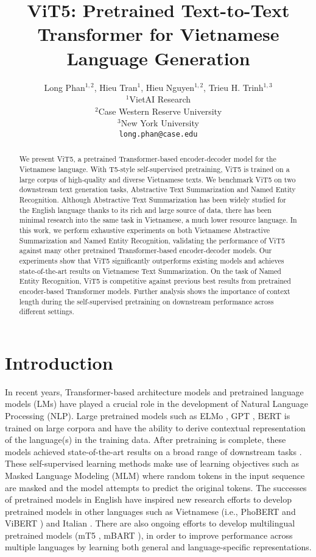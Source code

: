 \documentclass[11pt,a4paper]{article}
\title{ViT5: Pretrained Text-to-Text Transformer for Vietnamese Language Generation}
\author{Long Phan$^{1,2}$, Hieu Tran$^{1}$, Hieu Nguyen$^{1,2}$, Trieu H. Trinh$^{1,3}$ \\
        $^{1}$VietAI Research \\  $^{2}$Case Western Reserve University \\
        $^{3}$New York University \\
        \texttt{long.phan@case.edu}}
\date{}
\begin{document}
\maketitle
\begin{abstract}




We present ViT5, a pretrained Transformer-based encoder-decoder model for the Vietnamese language. 
With T5-style self-supervised pretraining, ViT5 is trained on a large corpus of high-quality and diverse Vietnamese texts. We benchmark ViT5 on two downstream text generation tasks, Abstractive Text Summarization and Named Entity Recognition. Although Abstractive Text Summarization has been widely studied for the English language thanks to its rich and large source of data, there has been minimal research into the same task in Vietnamese, a much lower resource language. In this work, we perform exhaustive experiments on both Vietnamese Abstractive Summarization and Named Entity Recognition, validating the performance of ViT5 against many other pretrained Transformer-based encoder-decoder models. Our experiments show that ViT5 significantly outperforms existing models and achieves state-of-the-art results on Vietnamese Text Summarization. On the task of Named Entity Recognition, ViT5 is competitive against previous best results from pretrained encoder-based Transformer models. Further analysis shows the importance of context length during the self-supervised pretraining on downstream performance across different settings. \end{abstract}

\section{Introduction}
In recent years, Transformer-based architecture models and pretrained language models (LMs) have played a crucial role in the development of Natural Language Processing (NLP). Large pretrained models such as ELMo \cite{elmo}, GPT \cite{GPT}, BERT \cite{bert} is trained on large corpora and have the ability to derive contextual representation of the language(s) in the training data. After pretraining is complete, these models achieved state-of-the-art results on a broad range of downstream tasks \cite{bert}. These self-supervised learning methods make use of learning objectives such as Masked Language Modeling (MLM) \cite{bert} where random tokens in the input sequence are masked and the model attempts to predict the original tokens. The successes of pretrained models in English have inspired new research efforts to develop pretrained models in other languages such as Vietnamese (i.e., PhoBERT \cite{phobert} and ViBERT \cite{vibert}) and Italian \cite{it5}. There are also ongoing efforts to develop multilingual pretrained models (mT5 \cite{mT5}, mBART \cite{mbart}), in order to improve performance across multiple languages by learning both general and language-specific representations.
\end{document}
